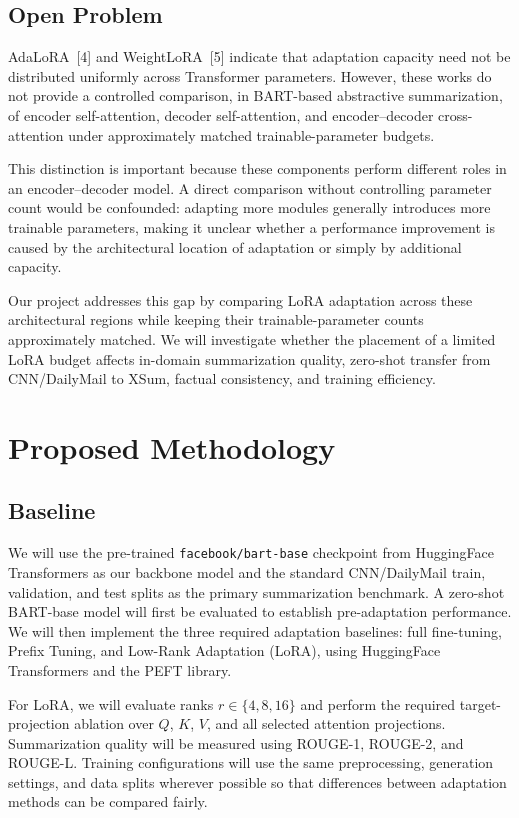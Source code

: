 \documentclass[11pt, letterpaper]{article}
\begin{document}
\subsection{Open Problem}

AdaLoRA~[4] and WeightLoRA~[5] indicate that adaptation capacity need not be
distributed uniformly across Transformer parameters. However, these works do
not provide a controlled comparison, in BART-based abstractive summarization,
of encoder self-attention, decoder self-attention, and encoder--decoder
cross-attention under approximately matched trainable-parameter budgets.

This distinction is important because these components perform different roles
in an encoder--decoder model. A direct comparison without controlling parameter
count would be confounded: adapting more modules generally introduces more
trainable parameters, making it unclear whether a performance improvement is
caused by the architectural location of adaptation or simply by additional
capacity.

Our project addresses this gap by comparing LoRA adaptation across these
architectural regions while keeping their trainable-parameter counts
approximately matched. We will investigate whether the placement of a limited
LoRA budget affects in-domain summarization quality, zero-shot transfer from
CNN/DailyMail to XSum, factual consistency, and training efficiency.

\section{Proposed Methodology}

\subsection{Baseline}

We will use the pre-trained \texttt{facebook/bart-base} checkpoint from
HuggingFace Transformers as our backbone model and the standard
CNN/DailyMail train, validation, and test splits as the primary summarization
benchmark. A zero-shot BART-base model will first be evaluated to establish
pre-adaptation performance. We will then implement the three required
adaptation baselines: full fine-tuning, Prefix Tuning, and Low-Rank Adaptation
(LoRA), using HuggingFace Transformers and the PEFT library.

For LoRA, we will evaluate ranks $r \in \{4,8,16\}$ and perform the required
target-projection ablation over $Q$, $K$, $V$, and all selected attention
projections. Summarization quality will be measured using ROUGE-1, ROUGE-2,
and ROUGE-L. Training configurations will use the same preprocessing,
generation settings, and data splits wherever possible so that differences
between adaptation methods can be compared fairly.
\end{document}
